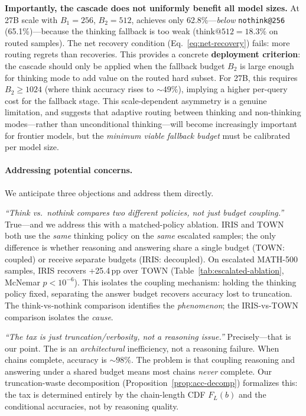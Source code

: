 \textbf{Importantly, the cascade does not uniformly benefit all model sizes.}
At 27B scale with $B_1{=}256$, $B_2{=}512$, \town{} achieves only 62.8\%---\emph{below} \texttt{nothink@256} (65.1\%)---because the thinking fallback is too weak ($\text{think@512} = 18.3\%$ on routed samples).
The net recovery condition (Eq.~\ref{eq:net-recovery}) fails: more routing regrets than recoveries.
This provides a concrete \textbf{deployment criterion}: the cascade should only be applied when the fallback budget $B_2$ is large enough for thinking mode to add value on the routed hard subset.
For 27B, this requires $B_2 \geq 1024$ (where think accuracy rises to ${\sim}49\%$), implying a higher per-query cost for the fallback stage.
This scale-dependent asymmetry is a genuine limitation, and suggests that adaptive routing between thinking and non-thinking modes---rather than unconditional thinking---will become increasingly important for frontier models, but the \emph{minimum viable fallback budget} must be calibrated per model size.

\paragraph{Addressing potential concerns.}
We anticipate three objections and address them directly.

\emph{``Think vs.\ nothink compares two different policies, not just budget coupling.''}
True---and we address this with a matched-policy ablation.
IRIS and TOWN both use the \emph{same} thinking policy on the \emph{same} escalated samples; the only difference is whether reasoning and answering share a single budget (TOWN: coupled) or receive separate budgets (IRIS: decoupled).
On escalated MATH-500 samples, IRIS recovers +25.4\,pp over TOWN (Table~\ref{tab:escalated-ablation}, McNemar $p < 10^{-6}$).
This isolates the coupling mechanism: holding the thinking policy fixed, separating the answer budget recovers accuracy lost to truncation.
The think-vs-nothink comparison identifies the \emph{phenomenon}; the IRIS-vs-TOWN comparison isolates the \emph{cause}.

\emph{``The tax is just truncation/verbosity, not a reasoning issue.''}
Precisely---that is our point.
The \couplingtax{} is an \emph{architectural} inefficiency, not a reasoning failure.
When chains complete, accuracy is ${\sim}98\%$.
The problem is that coupling reasoning and answering under a shared budget means most chains \emph{never} complete.
Our truncation-waste decomposition (Proposition~\ref{prop:acc-decomp}) formalizes this: the tax is determined entirely by the chain-length CDF $F_L(b)$ and the conditional accuracies, not by reasoning quality.

